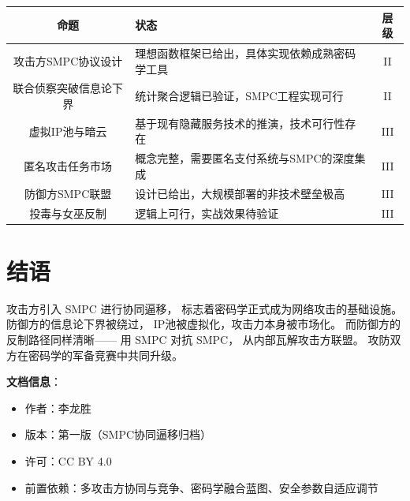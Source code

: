 \documentclass[11pt,a4paper]{article}
\begin{document}
\begin{center}
\begin{xltabular}{\textwidth}{c|X|c}
\toprule
\textbf{命题} & \textbf{状态} & \textbf{层级} \\
\midrule
攻击方SMPC协议设计 &
理想函数框架已给出，具体实现依赖成熟密码学工具 &
II \\
联合侦察突破信息论下界 &
统计聚合逻辑已验证，SMPC工程实现可行 &
II \\
虚拟IP池与暗云 &
基于现有隐藏服务技术的推演，技术可行性存在 &
III \\
匿名攻击任务市场 &
概念完整，需要匿名支付系统与SMPC的深度集成 &
III \\
防御方SMPC联盟 &
设计已给出，大规模部署的非技术壁垒极高 &
III \\
投毒与女巫反制 &
逻辑上可行，实战效果待验证 &
III \\
\bottomrule
\end{xltabular}
\end{center}

\section{结语}

攻击方引入 SMPC 进行协同逼移，
标志着密码学正式成为网络攻击的基础设施。
防御方的信息论下界被绕过，
IP池被虚拟化，攻击力本身被市场化。
而防御方的反制路径同样清晰——
用 SMPC 对抗 SMPC，
从内部瓦解攻击方联盟。
攻防双方在密码学的军备竞赛中共同升级。

\vspace{5mm}
\noindent\textbf{文档信息}：
\begin{itemize}
    \item 作者：李龙胜
    \item 版本：第一版（SMPC协同逼移归档）
    \item 许可：CC BY 4.0
    \item 前置依赖：多攻击方协同与竞争、密码学融合蓝图、安全参数自适应调节
\end{itemize}
\end{document}
